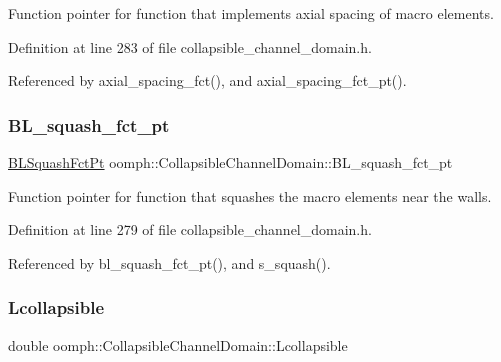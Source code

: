 Function pointer for function that implements axial spacing of macro elements. 



Definition at line 283 of file collapsible\+\_\+channel\+\_\+domain.\+h.



Referenced by axial\+\_\+spacing\+\_\+fct(), and axial\+\_\+spacing\+\_\+fct\+\_\+pt().

\mbox{\label{classoomph_1_1CollapsibleChannelDomain_a3d3f5d77c3221da20cd02bf02be800b7}} 
\subsubsection{\texorpdfstring{B\+L\+\_\+squash\+\_\+fct\+\_\+pt}{BL\_squash\_fct\_pt}}
{\footnotesize\ttfamily \hyperlink{classoomph_1_1CollapsibleChannelDomain_a2bf1d7943bfac134a5c27a54c7e1faed}{B\+L\+Squash\+Fct\+Pt} oomph\+::\+Collapsible\+Channel\+Domain\+::\+B\+L\+\_\+squash\+\_\+fct\+\_\+pt\hspace{0.3cm}{\ttfamily [private]}}



Function pointer for function that squashes the macro elements near the walls. 



Definition at line 279 of file collapsible\+\_\+channel\+\_\+domain.\+h.



Referenced by bl\+\_\+squash\+\_\+fct\+\_\+pt(), and s\+\_\+squash().

\mbox{\label{classoomph_1_1CollapsibleChannelDomain_aa44cd6613cea2a67dda8f4de0d9c6f1e}} 
\subsubsection{\texorpdfstring{Lcollapsible}{Lcollapsible}}
{\footnotesize\ttfamily double oomph\+::\+Collapsible\+Channel\+Domain\+::\+Lcollapsible\hspace{0.3cm}{\ttfamily [private]}}



